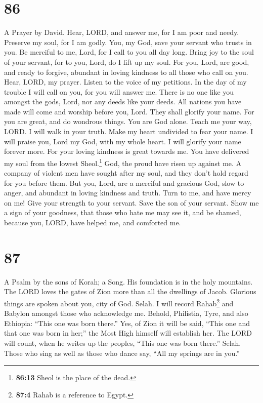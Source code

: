 \hypertarget{section-78}{%
\section{86}\label{section-78}}

A Prayer by David.  Hear, LORD, and answer me, for I am
poor and needy.  Preserve my soul, for I am godly. You, my
God, save your servant who trusts in you.  Be merciful to
me, Lord, for I call to you all day long.  Bring joy to
the soul of your servant, for to you, Lord, do I lift up my soul.
 For you, Lord, are good, and ready to forgive, abundant
in loving kindness to all those who call on you.  Hear,
LORD, my prayer. Listen to the voice of my petitions.  In
the day of my trouble I will call on you, for you will answer me.
 There is no one like you amongst the gods, Lord, nor any
deeds like your deeds.  All nations you have made will
come and worship before you, Lord. They shall glorify your name.
 For you are great, and do wondrous things. You are God
alone.  Teach me your way, LORD. I will walk in your
truth. Make my heart undivided to fear your name.  I will
praise you, Lord my God, with my whole heart. I will glorify your name
forever more.  For your loving kindness is great towards
me. You have delivered my soul from the lowest Sheol.\footnote{\textbf{86:13}
  Sheol is the place of the dead.}  God, the proud have
risen up against me. A company of violent men have sought after my soul,
and they don't hold regard for you before them.  But you,
Lord, are a merciful and gracious God, slow to anger, and abundant in
loving kindness and truth.  Turn to me, and have mercy on
me! Give your strength to your servant. Save the son of your servant.
 Show me a sign of your goodness, that those who hate me
may see it, and be shamed, because you, LORD, have helped me, and
comforted me.

\hypertarget{section-79}{%
\section{87}\label{section-79}}

A Psalm by the sons of Korah; a Song.  His foundation is
in the holy mountains.  The LORD loves the gates of Zion
more than all the dwellings of Jacob.  Glorious things are
spoken about you, city of God. Selah.  I will record
Rahab\footnote{\textbf{87:4} Rahab is a reference to Egypt.} and Babylon
amongst those who acknowledge me. Behold, Philistia, Tyre, and also
Ethiopia: ``This one was born there.''  Yes, of Zion it
will be said, ``This one and that one was born in her;'' the Most High
himself will establish her.  The LORD will count, when he
writes up the peoples, ``This one was born there.'' Selah.
 Those who sing as well as those who dance say, ``All my
springs are in you.''


